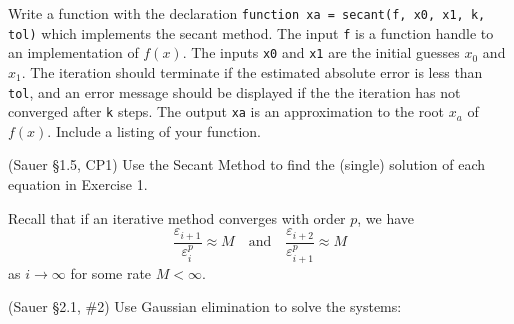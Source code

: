 \documentclass[12pt,fleqn]{exam}
\begin{document}
\begin{questions}
\question Write a function with the declaration \verb$function xa = secant(f, x0, x1, k, tol)$ which implements the secant method. The input \verb$f$ is a function handle to an implementation of $f(x)$. The inputs \verb$x0$ and \verb$x1$ are the initial guesses $x_0$ and $x_1$. The iteration should terminate if the estimated absolute error is less than \verb$tol$, and an error message should be displayed if the the iteration has not converged after \verb$k$ steps. The output \verb$xa$ is an approximation to the root $x_a$ of $f(x)$. Include a listing of your function.

\question (Sauer \S1.5, CP1) Use the Secant Method to find the (single) solution of each equation in Exercise 1. 

\question Recall that if an iterative method converges with order $p$, we have
\[\frac{\varepsilon_{i+1}}{\varepsilon_i^p} \approx M \quad\text{and}\quad \frac{\varepsilon_{i+2}}{\varepsilon_{i+1}^p} \approx M\]
as $i \rightarrow \infty$ for some rate $M < \infty$.


\question (Sauer \S2.1, \#2) Use Gaussian elimination to solve the systems:

\end{questions}
\end{document}
